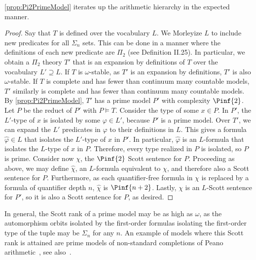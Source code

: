 \documentclass{amsart}
\renewcommand{\-}{\text{-}}
\begin{document}
\cref{prop:Pi2PrimeModel} iterates up the arithmetic hierarchy in the expected manner.

\pinprime

\begin{proof}
Say that $T$ is defined over the vocabulary $L$.
We Morleyize $L$ to include new predicates for all $\Sigma_n$ sets.
This can be done in a manner where the definitions of each new predicate are $\Pi_2$ (see \cite{Part2} Definition II.25).
In particular, we obtain a $\Pi_2$ theory $T'$ that is an expansion by definitions of $T$ over the vocabulary $L'\supseteq L$.
If $T$ is $\omega$-stable, as $T'$ is an expansion by definitions, $T'$ is also $\omega$-stable.
If $T$ is complete and has fewer than continuum many countable models, $T'$ similarly is complete and has fewer than continuum many countable models.
By \cref{prop:Pi2PrimeModel}, $T'$ has a prime model $P'$ with complexity $\Pinf{2}$.
Let $P$ be the reduct of $P'$ with $P\models T$.
Consider the type of some $x\in P$.
In $P'$, the $L'$-type of $x$ is isolated by some $\varphi\in L'$, because $P'$ is a prime model.
Over $T'$, we can expand the $L'$ predicates in $\varphi$ to their definitions in $L$.
This gives a formula $\hat{\varphi}\in L$ that isolates the $L'$-type of $x$ in $P'$.
In particular, $\hat{\varphi}$ is an $L$-formula that isolates the $L$-type of $x$ in $P$.
Therefore, every type realized in $P$ is isolated, so $P$ is prime.
Consider now $\chi$, the $\Pinf{2}$ Scott sentence for $P$.
Proceeding as above, we may define $\hat{\chi}$, an $L$-formula equivalent to $\chi$, and therefore also a Scott sentence for $P$.
Furthermore, as each quantifier-free formula in $\chi$ is replaced by a formula of quantifier depth $n$, $\hat{\chi}$ is  $\Pinf{n+2}$.
Lastly, $\chi$ is an $L$-Scott sentence for $P'$, so it is also a Scott sentence for $P$, as desired.
\end{proof}

In general, the Scott rank of a prime model may be as high as $\omega$, as the automorphism orbits isolated by the first-order formulas isolating the first-order type of the tuple may be $\Sigma_n$ for any $n$. An example of models where this Scott rank is attained are prime models of non-standard completions of Peano arithmetic~\cite{montalban2024}, see also~\cite{GLRS}.
\end{document}
